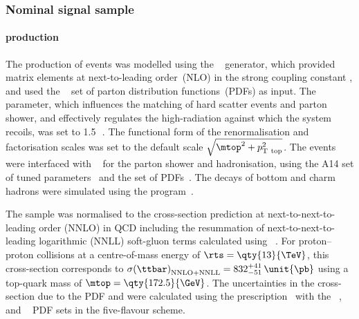 \subsubsection{Nominal signal sample}%
\label{sec:datamc:mc_nominal_signal} 

\paragraph*{\ttbar production}

The production of \ttbar events was modelled using the
\POWHEGBOX[v2]~\cite{Frixione:2007nw,Nason:2004rx,Frixione:2007vw,Alioli:2010xd}
generator, which provided matrix elements at next-to-leading
order~(NLO) in the strong coupling constant \alphas, and used the
\NNPDF[3.0nlo]~\cite{Ball:2014uwa} set of parton distribution functions~(PDFs) as input.
The \hdamp parameter, which influences the matching of \POWHEG hard scatter events
and parton shower, and effectively regulates the high-\pt radiation against which the
\ttbar system recoils, was set to 1.5\,\mtop~\cite{ATL-PHYS-PUB-2016-020}.
The functional form of the renormalisation and factorisation scales was
set to the default scale \(\sqrt{\mtop^{2} + p_\mathrm{T\ top}^2}\).
The events were interfaced with
\PYTHIA[8.230]~\cite{Sjostrand:2014zea} for the parton shower and
hadronisation, using the A14 set of tuned
parameters~\cite{ATL-PHYS-PUB-2014-021} and the \NNPDF[2.3lo]
set of PDFs~\cite{Ball:2012cx}.
The decays of bottom and charm hadrons were simulated using the
\EVTGEN[1.6.0] program~\cite{Lange:2001uf}.

The \ttbar sample was normalised to the cross-section prediction at
next-to-next-to-leading order (NNLO) in QCD including the resummation of
next-to-next-to-leading logarithmic (NNLL) soft-gluon terms calculated using
\TOPpp[2.0]~\cite{Beneke:2011mq,Cacciari:2011hy,Baernreuther:2012ws,Czakon:2012zr,Czakon:2012pz,Czakon:2013goa,Czakon:2011xx}.
For proton--proton collisions at a centre-of-mass energy of  %
\(\rts = \qty{13}{\TeV}\), this cross-section corresponds to
\(\sigma{(\ttbar)}_{\mathrm{NNLO+NNLL}} = 832^{+41}_{-51}\,\unit{\pb}\) using
a top-quark mass of \(\mtop = \qty{172.5}{\GeV}\).
The uncertainties in the cross-section due to the PDF and \alphas were
calculated using the \PDFforLHC[15] prescription~\cite{Butterworth:2015oua}
with the \MMHT[nnlo]~\cite{Harland-Lang:2014zoa},
\CT[14nnlo]~\cite{Dulat:2015mca} and \NNPDF[3.0lo]~\cite{Ball:2014uwa}
PDF sets in the five-flavour scheme.

